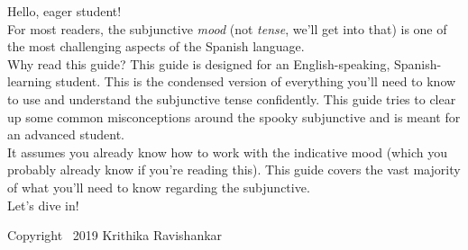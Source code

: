 Hello, eager student!\\

For most readers, the subjunctive \textit{mood} (not \textit{tense}, we'll get into that) is one of the most challenging aspects of the Spanish language. \\

Why read this guide? This guide is designed for an English-speaking, Spanish-learning student. This is the condensed version of everything you'll need to know to use and understand the subjunctive tense confidently. This guide tries to clear up some common misconceptions around the spooky subjunctive and is meant for an advanced student. \\

It assumes you already know how to work with the indicative mood (which you probably already know if you're reading this). This guide covers the vast majority of what you'll need to know regarding the subjunctive.  \\

Let's dive in!

\vfill
{\footnotesize Copyright \textcopyright\ 2019 Krithika Ravishankar}

